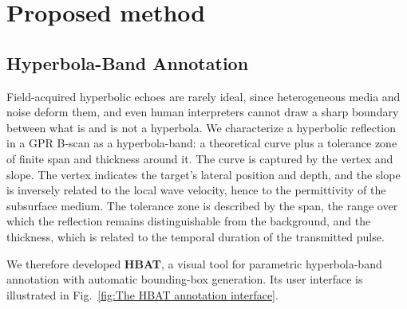 \documentclass[lettersize,journal]{IEEEtran}
\begin{document}


\section{Proposed method}
\subsection{Hyperbola-Band Annotation}
Field-acquired hyperbolic echoes are rarely ideal, since heterogeneous media and noise deform them, and even human interpreters cannot draw a sharp boundary between what is and is not a hyperbola.
We characterize a hyperbolic reflection in a GPR B-scan as a hyperbola-band: a theoretical curve plus a tolerance zone of finite span and thickness around it.
The curve is captured by the vertex and slope.
The vertex indicates the target's lateral position and depth, and the slope is inversely related to the local wave velocity, hence to the permittivity of the subsurface medium.
The tolerance zone is described by the span, the range over which the reflection remains distinguishable from the background, and the thickness, which is related to the temporal duration of the transmitted pulse.

We therefore developed \textbf{HBAT}, a visual tool for parametric hyperbola-band annotation with automatic bounding-box generation. Its user interface is illustrated in Fig.~\ref{fig:The HBAT annotation interface}.
\end{document}
